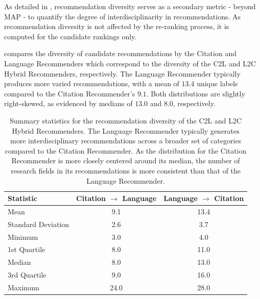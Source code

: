As detailed in , recommendation diversity serves as a secondary metric - beyond \ac{MAP} - to quantify the degree of interdisciplinarity in recommendations.
As recommendation diversity is not affected by the re-ranking process, it is computed for the candidate rankings only.

 compares the diversity of candidate recommendations by the Citation and Language Recommenders which correspond to the diversity of the \ac{C2L} and \ac{L2C} Hybrid Recommenders, respectively.
The Language Recommender typically produces more varied recommendations, with a mean of $13.4$ unique labels compared to the Citation Recommender's $9.1$. Both distributions are slightly right-skewed, as evidenced by medians of $13.0$ and $8.0$, respectively.

\begin{table}[htb!]
    \centering
    \begin{tabular}{lcc}
        \toprule
        \textbf{Statistic} & \textbf{Citation $\rightarrow$ Language} & \textbf{Language $\rightarrow$ Citation} \\
        \midrule
        Mean               & 9.1                                      & 13.4                                     \\
        Standard Deviation & 2.6                                      & 3.7                                      \\
        Minimum            & 3.0                                      & 4.0                                      \\
        1st Quartile       & 8.0                                      & 11.0                                     \\
        Median             & 8.0                                      & 13.0                                     \\
        3rd Quartile       & 9.0                                      & 16.0                                     \\
        Maximum            & 24.0                                     & 28.0                                     \\
        \bottomrule
    \end{tabular}
    \caption[Comparison of Recommendation Diversity]{Summary statistics for the recommendation diversity of the \ac{C2L} and \ac{L2C} Hybrid Recommenders. The Language Recommender typically generates more interdisciplinary recommendations across a broader set of categories compared to the Citation Recommender. As the distribution for the Citation Recommender is more closely centered around its median, the number of research fields in its recommendations is more consistent than that of the Language Recommender.}
    \label{tab:diversity}
\end{table}


